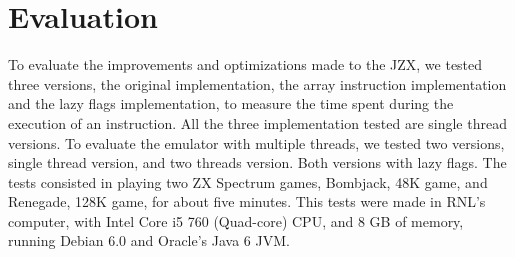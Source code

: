 \section{Evaluation}
To evaluate the improvements and optimizations made to the JZX, we tested three versions, the original implementation, the array instruction implementation and the lazy flags implementation, to measure the time spent during the execution of an instruction. All the three implementation tested are single thread versions. To evaluate the emulator with multiple threads, we tested two versions, single thread version, and two threads version. Both versions with lazy flags. The tests consisted in playing two ZX Spectrum games,  Bombjack, 48K game, and Renegade, 128K game, for about five minutes. This tests were made in RNL's computer, with Intel Core i5 760 (Quad-core) CPU, and 8 GB of memory, running Debian 6.0 and Oracle's Java 6 JVM.

